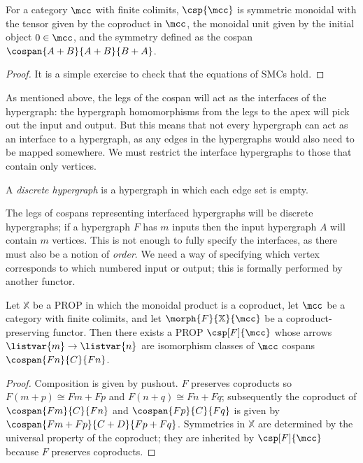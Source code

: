 \begin{lemma}
    For a category \(\mcc\) with finite colimits,
    \(\csp{\mcc}\) is symmetric monoidal with the tensor given by the
    coproduct in \(\mcc\), the monoidal unit given by the initial object
    \(0 \in \mcc\), and the symmetry defined as the cospan
    \(\cospan{A+B}{A+B}{B+A}\).
\end{lemma}
\begin{proof}
    It is a simple exercise to check that the equations of SMCs hold.
\end{proof}

As mentioned above, the legs of the cospan will act as the interfaces of the
hypergraph: the hypergraph homomorphisms from the legs to the apex will pick out
the input and output.
But this means that not every hypergraph can act as an interface to a
hypergraph, as any edges in the hypergraphs would also need to be mapped
somewhere.
We must restrict the interface hypergraphs to those that contain only vertices.

\begin{definition}
    A \emph{discrete hypergraph} is a hypergraph in which each edge set is
    empty.
\end{definition}

The legs of cospans representing interfaced hypergraphs will be discrete
hypergraphs; if a hypergraph \(F\) has \(m\) inputs then the input hypergraph
\(A\) will contain \(m\) vertices.
This is not enough to fully specify the interfaces, as there must also be a
notion of \emph{order}.
We need a way of specifying which vertex corresponds to which numbered input or
output; this is formally performed by another functor.

\begin{theorem}\label{thm:csp-construction}
    Let \(\mathbb{X}\) be a PROP in which the monoidal product is a coproduct,
    let \(\mcc\) be a category with finite colimits, and
    let \(\morph{F}{\mathbb{X}}{\mcc}\) be a coproduct-preserving functor.
    Then there exists a PROP \(\csp[F]{\mcc}\) whose arrows
    \(\listvar{m} \to \listvar{n}\) are isomorphism classes of \(\mcc\)
    cospans \(\cospan{Fn}{C}{Fn}\).
\end{theorem}
\begin{proof}
    Composition is given by pushout.
    \(F\) preserves coproducts so \(F(m+p) \cong Fm + Fp\) and
    \(F(n+q) \cong Fn + Fq\); subsequently the coproduct of
    \(\cospan{Fm}{C}{Fn}\) and \(\cospan{Fp}{C}{Fq}\) is given by \(
    \cospan{Fm + Fp}{C + D}{Fp + Fq}
    \).
    Symmetries in \(\mathbb{X}\) are determined by the universal property of
    the coproduct; they are inherited by \(\csp[F]{\mcc}\) because \(F\)
    preserves coproducts.
\end{proof}

